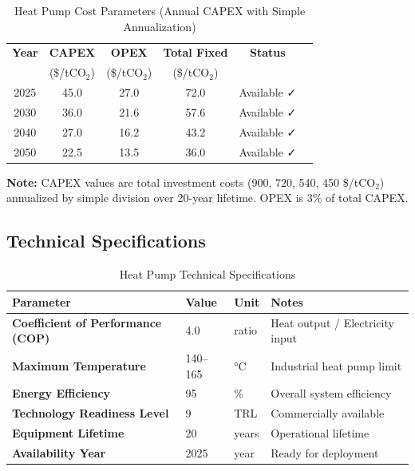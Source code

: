 \documentclass[11pt,a4paper]{report}
\newcommand{\tco}{tCO$_2$}
\begin{document}
\begin{table}[H]
\centering
\caption{Heat Pump Cost Parameters (Annual CAPEX with Simple Annualization)}
\begin{tabular}{cccccc}
\toprule
\textbf{Year} & \textbf{CAPEX} & \textbf{OPEX} & \textbf{Total Fixed} & \textbf{Status} \\
 & (\$/\tco) & (\$/\tco) & (\$/\tco) & \\
\midrule
2025 & 45.0 & 27.0 & 72.0 & Available ✓ \\
2030 & 36.0 & 21.6 & 57.6 & Available ✓ \\
2040 & 27.0 & 16.2 & 43.2 & Available ✓ \\
2050 & 22.5 & 13.5 & 36.0 & Available ✓ \\
\bottomrule
\end{tabular}
\label{tab:heatpump-costs}
\end{table}

\textbf{Note:} CAPEX values are total investment costs (900, 720, 540, 450 \$/\tco) annualized by simple division over 20-year lifetime. OPEX is 3\% of total CAPEX.

\subsection{Technical Specifications}

\begin{table}[H]
\centering
\caption{Heat Pump Technical Specifications}
\begin{tabular}{p{6cm}p{3cm}p{2cm}p{4cm}}
\toprule
\textbf{Parameter} & \textbf{Value} & \textbf{Unit} & \textbf{Notes} \\
\midrule
\textbf{Coefficient of Performance (COP)} & 4.0 & ratio & Heat output / Electricity input \\
\textbf{Maximum Temperature} & 140--165 & °C & Industrial heat pump limit \\
\textbf{Energy Efficiency} & 95 & \% & Overall system efficiency \\
\textbf{Technology Readiness Level} & 9 & TRL & Commercially available \\
\textbf{Equipment Lifetime} & 20 & years & Operational lifetime \\
\textbf{Availability Year} & 2025 & year & Ready for deployment \\
\bottomrule
\end{tabular}
\label{tab:heatpump-specs}
\end{table}
\end{document}
